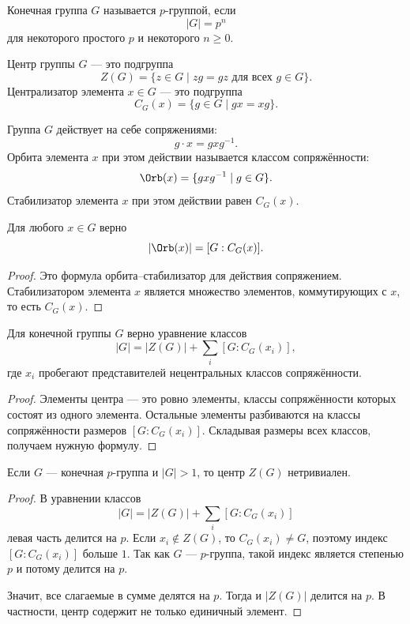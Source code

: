 \begin{definition}
    Конечная группа $G$ называется $p$-группой, если
    \[
        |G|=p^n
    \]
    для некоторого простого $p$ и некоторого $n\ge0$.
\end{definition}

\begin{definition}
    Центр группы $G$ --- это подгруппа
    \[
        Z(G)=\{z\in G \mid zg=gz \text{ для всех } g\in G\}.
    \]
    Централизатор элемента $x\in G$ --- это подгруппа
    \[
        C_G(x)=\{g\in G\mid gx=xg\}.
    \]
\end{definition}

\begin{definition}
    Группа $G$ действует на себе сопряжениями:
    \[
        g\cdot x = gxg^{-1}.
    \]
    Орбита элемента $x$ при этом действии называется классом сопряжённости:
    \[
        \Orb(x)=\{gxg^{-1}\mid g\in G\}.
    \]
    Стабилизатор элемента $x$ при этом действии равен $C_G(x)$.
\end{definition}

\begin{stmt}
    Для любого $x\in G$ верно
    \[
        |\Orb(x)|=[G:C_G(x)].
    \]

    \begin{proof}
        Это формула орбита--стабилизатор для действия сопряжением. Стабилизатором элемента $x$ является множество элементов,
        коммутирующих с $x$, то есть $C_G(x)$.
    \end{proof}
\end{stmt}

\begin{stmt}
    Для конечной группы $G$ верно уравнение классов
    \[
        |G| = |Z(G)| + \sum_i [G:C_G(x_i)],
    \]
    где $x_i$ пробегают представителей нецентральных классов сопряжённости.

    \begin{proof}
        Элементы центра --- это ровно элементы, классы сопряжённости которых состоят из одного элемента.
        Остальные элементы разбиваются на классы сопряжённости размеров $[G:C_G(x_i)]$. Складывая размеры всех классов,
        получаем нужную формулу.
    \end{proof}
\end{stmt}

\begin{stmt}
    Если $G$ --- конечная $p$-группа и $|G|>1$, то центр $Z(G)$ нетривиален.

    \begin{proof}
        В уравнении классов
        \[
            |G| = |Z(G)| + \sum_i [G:C_G(x_i)]
        \]
        левая часть делится на $p$. Если $x_i\notin Z(G)$, то $C_G(x_i)\neq G$, поэтому индекс $[G:C_G(x_i)]$ больше
        $1$. Так как $G$ --- $p$-группа, такой индекс является степенью $p$ и потому делится на $p$.

        Значит, все слагаемые в сумме делятся на $p$. Тогда и $|Z(G)|$ делится на $p$. В частности, центр содержит не только единичный элемент.
    \end{proof}
\end{stmt}

